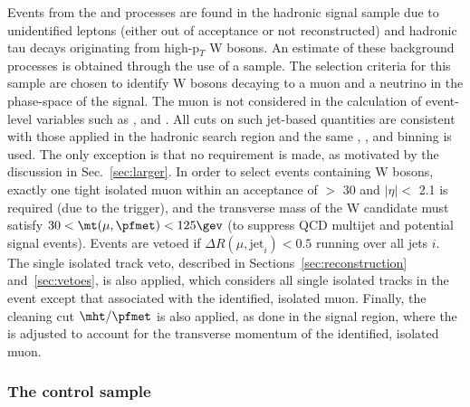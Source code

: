 Events from the \wj and \ttbar processes are found in the hadronic
signal sample due to unidentified leptons (either out of acceptance or
not reconstructed) and hadronic tau decays originating from
high-p$_{T}$ W bosons. An estimate of these background processes is
obtained through the use of a \mj sample. The selection criteria for
this sample are chosen to identify W bosons decaying to a muon and a
neutrino in the phase-space of the signal. The muon is not considered
in the calculation of event-level variables such as \scalht, \mht and
\alphat. All cuts on such jet-based quantities are consistent with
those applied in the hadronic search region and the same \njet, \nb,
and \scalht binning is used. The only exception is that no \alphat
requirement is made, as motivated by the discussion in
Sec.~\ref{sec:larger}. In order to select events containing W bosons,
exactly one tight isolated muon within an acceptance of \PT $>$ 30
\gev and $|\eta| <$ 2.1 is required (due to the trigger), and the
transverse mass of the W candidate must satisfy $30 < \mt(\mu,\pfmet)
< 125\gev$ (to suppress QCD multijet and potential signal
events). Events are vetoed if $\Delta R(\mu,\textrm{jet}_i) < 0.5$
running over all jets $i$. The single isolated track veto, described
in Sections~\ref{sec:reconstruction} and~\ref{sec:vetoes}, is also
applied, which considers all single isolated tracks in the event
except that associated with the identified, isolated muon. Finally,
the cleaning cut $\mht/\pfmet$ is also applied, as done in the signal
region, where the \pfmet is adjusted to account for the transverse
momentum of the identified, isolated muon.


\subsubsection{The \texorpdfstring{\mmj}{di-muon plus jets} control sample}

